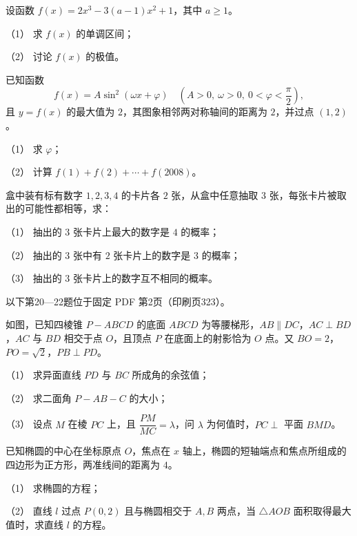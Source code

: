 \begin{question}
设函数 $f(x)=2x^3-3(a-1)x^2+1$，其中 $a\ge 1$。

（1） 求 $f(x)$ 的单调区间；

（2） 讨论 $f(x)$ 的极值。

\end{question}
\begin{question}
已知函数
\nopagebreak[4]
\[
f(x)=A\sin^2(\omega x+\varphi)\quad
\left(A>0,\ \omega>0,\ 0<\varphi<\dfrac{\pi}{2}\right),
\]
且 $y=f(x)$ 的最大值为 $2$，其图象相邻两对称轴间的距离为 $2$，并过点 $(1,2)$。

（1） 求 $\varphi$；

（2） 计算 $f(1)+f(2)+\cdots+f(2008)$。

\end{question}
\begin{question}
盒中装有标有数字 $1,2,3,4$ 的卡片各 $2$ 张，从盒中任意抽取 $3$ 张，每张卡片被取出的可能性都相等，求：

（1） 抽出的 $3$ 张卡片上最大的数字是 $4$ 的概率；

（2） 抽出的 $3$ 张中有 $2$ 张卡片上的数字是 $3$ 的概率；

（3） 抽出的 $3$ 张卡片上的数字互不相同的概率。

\begin{gktip}
以下第20—22题位于固定 PDF 第2页（印刷页323）。
\end{gktip}

\Needspace{0.4\textheight}
\end{question}
\begin{question}
如图，已知四棱锥 $P-ABCD$ 的底面 $ABCD$ 为等腰梯形，$AB\parallel DC$，$AC\perp BD$，$AC$ 与 $BD$ 相交于点 $O$，且顶点 $P$ 在底面上的射影恰为 $O$ 点。又 $BO=2$，$PO=\sqrt2$，$PB\perp PD$。

（1） 求异面直线 $PD$ 与 $BC$ 所成角的余弦值；

（2） 求二面角 $P-AB-C$ 的大小；

（3） 设点 $M$ 在棱 $PC$ 上，且 $\dfrac{PM}{MC}=\lambda$，问 $\lambda$ 为何值时，$PC\perp$ 平面 $BMD$。
\nopagebreak[4]
\begin{center}\end{center}
\nopagebreak[4]
\end{question}
\begin{question}
已知椭圆的中心在坐标原点 $O$，焦点在 $x$ 轴上，椭圆的短轴端点和焦点所组成的四边形为正方形，两准线间的距离为 $4$。

（1） 求椭圆的方程；

（2） 直线 $l$ 过点 $P(0,2)$ 且与椭圆相交于 $A,B$ 两点，当 $\triangle AOB$ 面积取得最大值时，求直线 $l$ 的方程。

\end{question}
